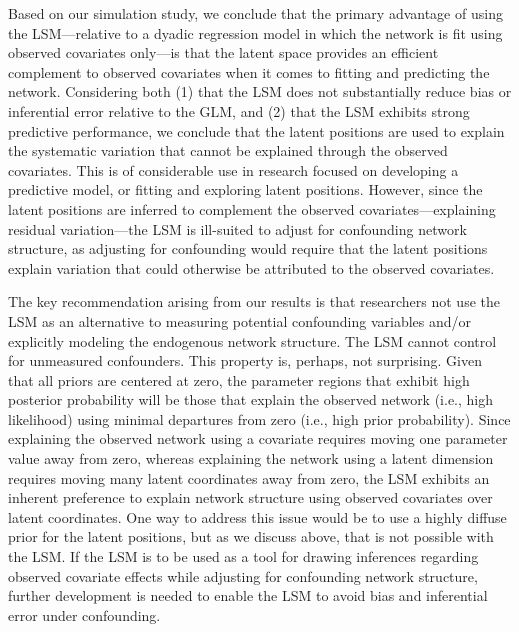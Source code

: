 \documentclass[11pt]{article}
\begin{document}
Based on our simulation study, we conclude that the primary advantage of using the LSM---relative to a dyadic regression model in which the network is fit using observed covariates only---is that the latent space provides an efficient complement to observed covariates when it comes to fitting and predicting the network. Considering both (1) that the LSM does not substantially reduce bias or inferential error relative to the GLM, and (2) that the LSM exhibits strong predictive performance, we conclude that the latent positions are used to explain the systematic variation that cannot be explained through the observed covariates. This is of considerable use in research focused on developing a predictive model, or fitting and exploring latent positions. However, since the latent positions are inferred to complement the observed covariates---explaining residual variation---the LSM is ill-suited to adjust for confounding network structure, as adjusting for confounding would require that the latent positions explain variation that could otherwise be attributed to the observed covariates.

The key recommendation arising from our results is that researchers not use the LSM as an alternative to measuring potential confounding variables and/or explicitly modeling the endogenous network structure. The LSM cannot control for unmeasured confounders. This property is, perhaps, not surprising. Given that all priors are centered at zero, the parameter regions that exhibit high posterior probability will be those that explain the observed network (i.e., high likelihood) using minimal departures from zero (i.e., high prior probability). Since explaining the observed network using a covariate requires moving one parameter value away from zero, whereas explaining the network using a latent dimension requires moving many latent coordinates away from zero, the LSM exhibits an inherent preference to explain network structure using observed covariates over latent coordinates. One way to address this issue would be to use a highly diffuse prior for the latent positions, but as we discuss above, that is not possible with the LSM. If the LSM is to be used as a tool for drawing inferences regarding observed covariate effects while adjusting for confounding network structure, further development is needed to enable the LSM to avoid bias and inferential error under confounding.

\newpage



\end{document}
